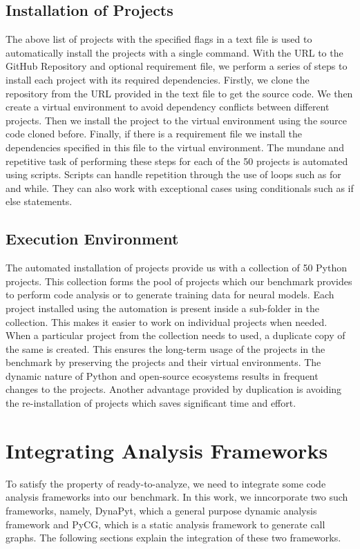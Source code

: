\subsection{Installation of Projects}
\label{approach:bash scripts}
The above list of projects with the specified flags in a text file is used to automatically install the projects with a single command.
With the URL to the GitHub Repository and optional requirement file, we perform a series of steps to install each project with its required dependencies.
Firstly, we clone the repository from the URL provided in the text file to get the source code.
We then create a virtual environment to avoid dependency conflicts between different projects.
Then we install the project to the virtual environment using the source code cloned before. 
Finally, if there is a requirement file we install the dependencies specified in this file to the virtual environment.
The mundane and repetitive task of performing these steps for each of the 50 projects is automated using scripts.
Scripts can handle repetition through the use of loops such as for and while.
They can also work with exceptional cases using conditionals such as if else statements.  

\subsection{Execution Environment}
\label{approach:collection of projects}
The automated installation of projects provide us with a collection of 50 Python projects.
This collection forms the pool of projects which our benchmark provides to perform code analysis or to generate training data for neural models.
Each project installed using the automation is present inside a sub-folder in the collection.
This makes it easier to work on individual projects when needed.
When a particular project from the collection needs to used, a duplicate copy of the same is created.
This ensures the long-term usage of the projects in the benchmark by preserving the projects and their virtual environments.
The dynamic nature of Python and open-source ecosystems results in frequent changes to the projects.
Another advantage provided by duplication is avoiding the re-installation of projects which saves significant time and effort. 

\section{Integrating Analysis Frameworks}
\label{approach:analysis framework}
To satisfy the property of ready-to-analyze, we need to integrate some code analysis frameworks into our benchmark.
In this work, we inncorporate two such frameworks, namely, DynaPyt,  which a general purpose dynamic analysis framework and PyCG, which is a static analysis framework to generate call graphs.
The following sections explain the integration of these two frameworks.
